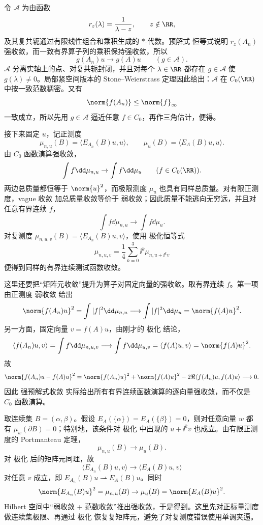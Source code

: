 令 $\mathscr A$ 为由函数
\[
 r_z(\lambda)=\frac1{\lambda-z},\qquad z\notin\RR,
\]
及其复共轭通过有限线性组合和乘积生成的 $*$-代数。预解式 恒等式说明 $r_z(A_n)$ 强收敛，而一致有界算子列的乘积保持强收敛，所以
\[
 g(A_n)u\to g(A)u\qquad(g\in\mathscr A).
\]
$\mathscr A$ 分离实轴上的点、对复共轭封闭，并且对每个 $\lambda\in\RR$ 都存在 $g\in\mathscr A$ 使 $g(\lambda)\neq0$。局部紧空间版本的 Stone--Weierstrass 定理因此给出：$\mathscr A$ 在 $C_0(\RR)$ 中按一致范数稠密。又有
\[
 \norm{f(A_n)}\le\norm{f}_{\infty}
\]
一致成立，所以先用 $g\in\mathscr A$ 逼近任意 $f\in C_0$，再作三角估计，便得。

接下来固定 $u$，记正测度
\[
 \mu_{n,u}(B)=\langle E_{A_n}(B)u,u\rangle,
 \qquad
 \mu_u(B)=\langle E_A(B)u,u\rangle.
\]
由 $C_0$ 函数演算强收敛，
\[
 \int f\dd\mu_{n,u}\to\int f\dd\mu_u
 \qquad(f\in C_0(\RR)).
\]
两边总质量都恒等于 $\norm{u}^2$，而极限测度 $\mu_u$ 也具有同样总质量。对有限正测度，vague 收敛 加总质量收敛等价于 弱收敛；因此质量不能逃向无穷远，并且对任意有界连续 $f$，
\begin{equation*}
 \int f\dd\mu_{n,u}\to\int f\dd\mu_u.
\end{equation*}
对复测度
$\mu_{n,u,v}(B)=\langle E_{A_n}(B)u,v\rangle$，使用 极化恒等式
\[
 \mu_{n,u,v}
 =\frac14\sum_{k=0}^3\ii^k\mu_{n,u+\ii^kv}
\]
便得到同样的有界连续测试函数收敛。

这里还要把“矩阵元收敛”提升为算子对固定向量的强收敛。取有界连续 $f$。第一项由正测度 弱收敛 给出
\[
 \norm{f(A_n)u}^2
 =\int |f|^2\dd\mu_{n,u}
 \longrightarrow
 \int |f|^2\dd\mu_u
 =\norm{f(A)u}^2.
\]
另一方面，固定向量 $v=f(A)u$，由刚才的 极化 结论，
\[
 \langle f(A_n)u,v\rangle
 =\int f\dd\mu_{n,u,v}
 \longrightarrow
 \int f\dd\mu_{u,v}
 =\langle f(A)u,v\rangle
 =\norm{f(A)u}^2.
\]
故
\[
 \norm{f(A_n)u-f(A)u}^2
 =\norm{f(A_n)u}^2+\norm{f(A)u}^2
 -2\Re\langle f(A_n)u,f(A)u\rangle
 \longrightarrow0.
\]
因此 强预解式收敛 实际给出所有有界连续函数演算的逐向量强收敛，而不仅是 $C_0$ 函数演算。

取连续集 $B=(\alpha,\beta)$。假设 $E_A(\{\alpha\})=E_A(\{\beta\})=0$，则对任意向量 $w$ 都有 $\mu_w(\partial B)=0$；特别地，该条件对 极化 中出现的 $u+\ii^kv$ 也成立。由有限正测度的 Portmanteau 定理，
\[
 \mu_{n,u}(B)\to\mu_u(B).
\]
对 极化 后的矩阵元同理，故
\[
 \langle E_{A_n}(B)u,v\rangle
 \to\langle E_A(B)u,v\rangle
\]
对任意 $v$ 成立，即 $E_{A_n}(B)u\rightharpoonup E_A(B)u$。同时
\[
 \norm{E_{A_n}(B)u}^2=\mu_{n,u}(B)\to\mu_u(B)
 =\norm{E_A(B)u}^2.
\]
Hilbert 空间中“弱收敛 + 范数收敛”推出强收敛，于是得到。这里先对正标量测度做连续集极限、再通过 极化 恢复复矩阵元，避免了对复测度错误使用单调夹逼。

